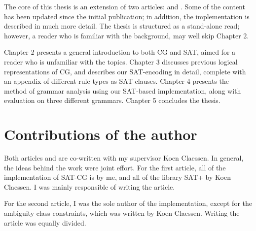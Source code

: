 The core of this thesis is an extension of two articles: \cite{listenmaa_claessen2015} and \cite{listenmaa_claessen2016}. Some of the content has been updated since the initial publication; in addition, the implementation is described in much more detail. The thesis is structured as a stand-alone read; however, a reader who is familiar with the background, may well skip Chapter 2.

Chapter 2 presents a general introduction to both CG and SAT, aimed for a reader who is unfamiliar with the topics.
Chapter 3 discusses previous logical representations of CG, and describes our SAT-encoding in detail, complete with an appendix of different rule types as SAT-clauses.
Chapter 4 presents the method of grammar analysis using our SAT-based implementation, along with evaluation on three different grammars.
Chapter 5 concludes the thesis.


\section{Contributions of the author}

Both articles \cite{listenmaa_claessen2015} and \cite{listenmaa_claessen2016}
are co-written with my supervisor Koen Claessen. In general, the ideas behind the work were joint effort.
For the first article, all of the implementation of SAT-CG is by me,
and all of the library SAT+ by Koen Claessen.
I was mainly responsible of writing the article.

For the second article, I was the sole author of the implementation, 
except for the ambiguity class constraints, which was written by Koen Claessen. 
Writing the article was equally divided.





